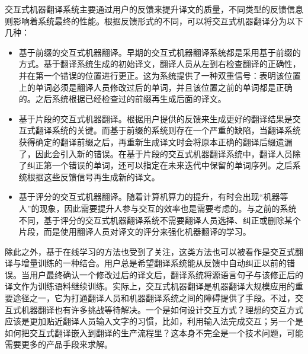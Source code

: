 \parinterval 交互式机器翻译系统主要通过用户的反馈来提升译文的质量，不同类型的反馈信息则影响着系统最终的性能。根据反馈形式的不同，可以将交互式机器翻译分为以下几种：
\begin{itemize}
\vspace{0.5em}
\item 基于前缀的交互式机器翻译。早期的交互式机器翻译系统都是采用基于前缀的方式。基于翻译系统生成的初始译文，翻译人员从左到右检查翻译的正确性，并在第一个错误的位置进行更正。这为系统提供了一种双重信号：表明该位置上的单词必须是翻译人员修改过后的单词，并且该位置之前的单词都是正确的。之后系统根据已经检查过的前缀再生成后面的译文。

\vspace{0.5em}
\item 基于片段的交互式机器翻译。根据用户提供的反馈来生成更好的翻译结果是交互式翻译系统的关键。而基于前缀的系统则存在一个严重的缺陷，当翻译系统获得确定的翻译前缀之后，再重新生成译文时会将原本正确的翻译后缀遗漏了，因此会引入新的错误。在基于片段的交互式机器翻译系统中，翻译人员除了纠正第一个错误的单词，还可以指定在未来迭代中保留的单词序列。之后系统根据这些反馈信号再生成新的译文。

\vspace{0.5em}
\item 基于评分的交互式机器翻译。随着计算机算力的提升，有时会出现“机器等人”的现象，因此需要提升人参与交互的效率也是需要考虑的。与之前的系统不同，基于评分的交互式机器翻译系统不需要翻译人员选择、纠正或删除某个片段，而是使用翻译人员对译文的评分来强化机器翻译的学习。

\vspace{0.5em}
\end{itemize}

\parinterval 除此之外，基于在线学习的方法也受到了关注，这类方法也可以被看作是交互式翻译与增量训练的一种结合。用户总是希望翻译系统能从反馈中自动纠正以前的错误。当用户最终确认一个修改过后的译文后，翻译系统将源语言句子与该修正后的译文作为训练语料继续训练。实际上，交互式机器翻译是机器翻译大规模应用的重要途径之一，它为打通翻译人员和机器翻译系统之间的障碍提供了手段。不过，交互式机器翻译也有许多挑战等待解决。一个是如何设计交互方式？理想的交互方式应该是更加贴近翻译人员输入文字的习惯，比如，利用输入法完成交互；另一个是如何把交互式翻译嵌入到翻译的生产流程里？这本身不完全是一个技术问题，可能需要更多的产品手段来求解。


